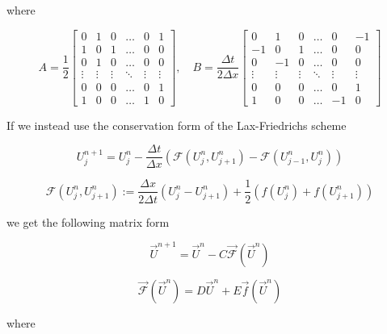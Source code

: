 \documentclass{myproject}
\begin{document}
where

\[
A = \frac{1}{2}
\begin{bmatrix}
0 & 1 & 0 & \dots & 0 & 1 \\
1 & 0 & 1 & \dots & 0 & 0 \\
0 & 1 & 0 & \dots & 0 & 0 \\
\vdots & \vdots & \vdots & \ddots & \vdots & \vdots \\
0 & 0 & 0 & \dots & 0 & 1 \\
1 & 0 & 0 & \dots & 1 & 0
\end{bmatrix},
\quad
B = \frac{\Delta t}{2 \Delta x}
\begin{bmatrix}
0 & 1 & 0 & \dots & 0 & -1 \\
-1 & 0 & 1 & \dots & 0 & 0 \\
0 & -1 & 0 & \dots & 0 & 0 \\
\vdots & \vdots & \vdots & \ddots & \vdots & \vdots \\
0 & 0 & 0 & \dots & 0 & 1 \\
1 & 0 & 0 & \dots & -1 & 0
\end{bmatrix}
\]

If we instead use the conservation form of the Lax-Friedrichs scheme

\[
    U_j^{n+1} = U_j^n - \frac{\Delta t}{\Delta x} \left( \mathcal{F}(U_{j}^{n}, U_{j+1}^{n}) - \mathcal{F}(U_{j-1}^{n}, U_{j}^{n}) \right)
\]

\[
    \mathcal{F}(U_j^n, U_{j+1}^n) := \frac{\Delta x}{2 \Delta t}(U_j^n - U_{j+1}^n) + \frac{1}{2}\left( f(U_j^n) + f(U_{j+1}^n) \right)
\]

we get the following matrix form

\[
\vec{U}^{n+1} = \vec{U}^{n} - C\vec{\mathcal{F}}(\vec{U}^{n})
\]

\[
\vec{\mathcal{F}}(\vec{U}^{n}) = D\vec{U}^{n} + E\vec{f}(\vec{U}^{n})
\]

where
\end{document}
